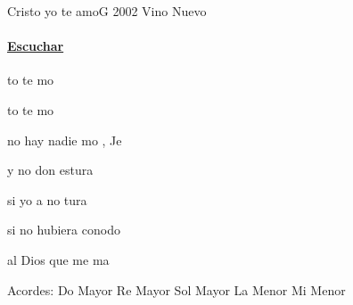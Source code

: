 \documentclass[12pt, spanish]{book}
\newcommand{\NotCCLIed}{\relax}
\begin{document}
    \begin{song}{Cristo yo te amo}{G}
    {2002} %
    {Vino Nuevo}
    {} %
    {} %
        \ifChordBk
            \paragraph{\mbox{}\hfill\protect\href{https://open.spotify.com/intl-es/track/2i3omjTIX5Q16rKnF6fGlL}{Escuchar}\mbox{}\hfill}
        \fi

        \begin{SBOpGroup}
            to  te mo

            to  te mo

            no hay nadie mo , Je
        \end{SBOpGroup}

        \begin{SBChorus}
            y no  don estura

            si yo a  no  tura

            si no hubiera conodo

            al Dios que me ma
        \end{SBChorus}


        \ifChordBk
        \begin{SBOpGroup}
            Acordes:
            \upchord{\C}\qquad Do Mayor \hfill
            \upchord{\D}\qquad Re Mayor \hfill\null\break
            \upchord{\G}\qquad Sol Mayor \hfill
            \upchord{\Am}\qquad La Menor \hfill
            \upchord{\Em}\qquad Mi Menor \hfill
        \end{SBOpGroup}
        \fi
    \end{song}
\end{document}
